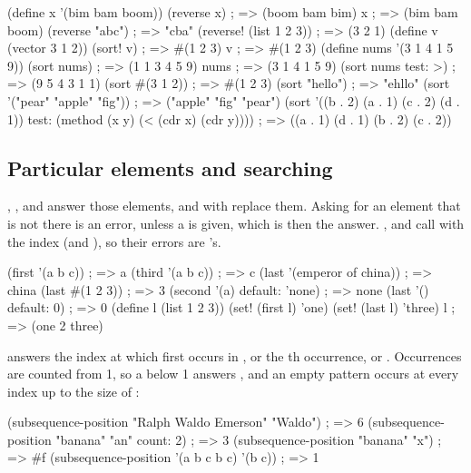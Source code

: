 \begin{dylan}
(define x '(bim bam boom))
(reverse x)                  ; => (boom bam bim)
x                            ; => (bim bam boom)
(reverse "abc")              ; => "cba"
(reverse! (list 1 2 3))      ; => (3 2 1)
(define v (vector 3 1 2))
(sort! v)                    ; => #(1 2 3)
v                            ; => #(1 2 3)
(define nums '(3 1 4 1 5 9))
(sort nums)                  ; => (1 1 3 4 5 9)
nums                         ; => (3 1 4 1 5 9)
(sort nums test: >)          ; => (9 5 4 3 1 1)
(sort #(3 1 2))              ; => #(1 2 3)
(sort "hello")               ; => "ehllo"
(sort '("pear" "apple" "fig"))           ; => ("apple" "fig" "pear")
(sort '((b . 2) (a . 1) (c . 2) (d . 1))
      test: (method (x y) (< (cdr x) (cdr y))))
; => ((a . 1) (d . 1) (b . 2) (c . 2))
\end{dylan}

\subsection{Particular elements and searching}

, ,  and  answer those
elements, and with  replace them. Asking for an element that
is not there is an error, unless a  is given, which is
then the answer. ,  and  call
 with the index (and ), so their errors
are 's.

\begin{dylan}
(first '(a b c))              ; => a
(third '(a b c))              ; => c
(last '(emperor of china))    ; => china
(last #(1 2 3))               ; => 3
(second '(a) default: 'none)  ; => none
(last '() default: 0)         ; => 0
(define l (list 1 2 3))
(set! (first l) 'one)
(set! (last l) 'three)
l                             ; => (one 2 three)
\end{dylan}

 answers the index
at which  first occurs in , or the
th occurrence, or . Occurrences are counted from
1, so a  below 1 answers , and an empty pattern
occurs at every index up to the size of :

\begin{dylan}
(subsequence-position "Ralph Waldo Emerson" "Waldo")   ; => 6
(subsequence-position "banana" "an" count: 2)          ; => 3
(subsequence-position "banana" "x")                    ; => #f
(subsequence-position '(a b c b c) '(b c))             ; => 1
\end{dylan}

